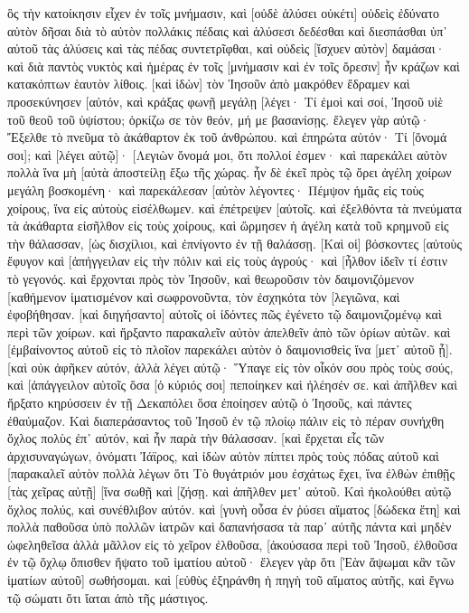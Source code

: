ὃς τὴν κατοίκησιν εἶχεν ἐν τοῖς μνήμασιν, καὶ [οὐδὲ ἁλύσει οὐκέτι] οὐδεὶς ἐδύνατο αὐτὸν δῆσαι 
διὰ τὸ αὐτὸν πολλάκις πέδαις καὶ ἁλύσεσι δεδέσθαι καὶ διεσπάσθαι ὑπ᾽ αὐτοῦ τὰς ἁλύσεις καὶ τὰς πέδας συντετρῖφθαι, καὶ οὐδεὶς [ἴσχυεν αὐτὸν] δαμάσαι· 
καὶ διὰ παντὸς νυκτὸς καὶ ἡμέρας ἐν τοῖς [μνήμασιν καὶ ἐν τοῖς ὄρεσιν] ἦν κράζων καὶ κατακόπτων ἑαυτὸν λίθοις. 
[καὶ ἰδὼν] τὸν Ἰησοῦν ἀπὸ μακρόθεν ἔδραμεν καὶ προσεκύνησεν [αὐτόν, 
καὶ κράξας φωνῇ μεγάλῃ [λέγει· Τί ἐμοὶ καὶ σοί, Ἰησοῦ υἱὲ τοῦ θεοῦ τοῦ ὑψίστου; ὁρκίζω σε τὸν θεόν, μή με βασανίσῃς. 
ἔλεγεν γὰρ αὐτῷ· Ἔξελθε τὸ πνεῦμα τὸ ἀκάθαρτον ἐκ τοῦ ἀνθρώπου. 
καὶ ἐπηρώτα αὐτόν· Τί [ὄνομά σοι]; καὶ [λέγει αὐτῷ]· [Λεγιὼν ὄνομά μοι, ὅτι πολλοί ἐσμεν· 
καὶ παρεκάλει αὐτὸν πολλὰ ἵνα μὴ [αὐτὰ ἀποστείλῃ ἔξω τῆς χώρας. 
ἦν δὲ ἐκεῖ πρὸς τῷ ὄρει ἀγέλη χοίρων μεγάλη βοσκομένη· 
καὶ παρεκάλεσαν [αὐτὸν λέγοντες· Πέμψον ἡμᾶς εἰς τοὺς χοίρους, ἵνα εἰς αὐτοὺς εἰσέλθωμεν. 
καὶ ἐπέτρεψεν [αὐτοῖς. καὶ ἐξελθόντα τὰ πνεύματα τὰ ἀκάθαρτα εἰσῆλθον εἰς τοὺς χοίρους, καὶ ὥρμησεν ἡ ἀγέλη κατὰ τοῦ κρημνοῦ εἰς τὴν θάλασσαν, [ὡς δισχίλιοι, καὶ ἐπνίγοντο ἐν τῇ θαλάσσῃ. 
[Καὶ οἱ] βόσκοντες [αὐτοὺς ἔφυγον καὶ [ἀπήγγειλαν εἰς τὴν πόλιν καὶ εἰς τοὺς ἀγρούς· καὶ [ἦλθον ἰδεῖν τί ἐστιν τὸ γεγονός. 
καὶ ἔρχονται πρὸς τὸν Ἰησοῦν, καὶ θεωροῦσιν τὸν δαιμονιζόμενον [καθήμενον ἱματισμένον καὶ σωφρονοῦντα, τὸν ἐσχηκότα τὸν [λεγιῶνα, καὶ ἐφοβήθησαν. 
[καὶ διηγήσαντο] αὐτοῖς οἱ ἰδόντες πῶς ἐγένετο τῷ δαιμονιζομένῳ καὶ περὶ τῶν χοίρων. 
καὶ ἤρξαντο παρακαλεῖν αὐτὸν ἀπελθεῖν ἀπὸ τῶν ὁρίων αὐτῶν. 
καὶ [ἐμβαίνοντος αὐτοῦ εἰς τὸ πλοῖον παρεκάλει αὐτὸν ὁ δαιμονισθεὶς ἵνα [μετ᾽ αὐτοῦ ᾖ]. 
[καὶ οὐκ ἀφῆκεν αὐτόν, ἀλλὰ λέγει αὐτῷ· Ὕπαγε εἰς τὸν οἶκόν σου πρὸς τοὺς σούς, καὶ [ἀπάγγειλον αὐτοῖς ὅσα [ὁ κύριός σοι] πεποίηκεν καὶ ἠλέησέν σε. 
καὶ ἀπῆλθεν καὶ ἤρξατο κηρύσσειν ἐν τῇ Δεκαπόλει ὅσα ἐποίησεν αὐτῷ ὁ Ἰησοῦς, καὶ πάντες ἐθαύμαζον. 
Καὶ διαπεράσαντος τοῦ Ἰησοῦ ἐν τῷ πλοίῳ πάλιν εἰς τὸ πέραν συνήχθη ὄχλος πολὺς ἐπ᾽ αὐτόν, καὶ ἦν παρὰ τὴν θάλασσαν. 
[καὶ ἔρχεται εἷς τῶν ἀρχισυναγώγων, ὀνόματι Ἰάϊρος, καὶ ἰδὼν αὐτὸν πίπτει πρὸς τοὺς πόδας αὐτοῦ 
καὶ [παρακαλεῖ αὐτὸν πολλὰ λέγων ὅτι Τὸ θυγάτριόν μου ἐσχάτως ἔχει, ἵνα ἐλθὼν ἐπιθῇς [τὰς χεῖρας αὐτῇ] [ἵνα σωθῇ καὶ [ζήσῃ. 
καὶ ἀπῆλθεν μετ᾽ αὐτοῦ. Καὶ ἠκολούθει αὐτῷ ὄχλος πολύς, καὶ συνέθλιβον αὐτόν. 
καὶ [γυνὴ οὖσα ἐν ῥύσει αἵματος [δώδεκα ἔτη] 
καὶ πολλὰ παθοῦσα ὑπὸ πολλῶν ἰατρῶν καὶ δαπανήσασα τὰ παρ᾽ αὐτῆς πάντα καὶ μηδὲν ὠφεληθεῖσα ἀλλὰ μᾶλλον εἰς τὸ χεῖρον ἐλθοῦσα, 
[ἀκούσασα περὶ τοῦ Ἰησοῦ, ἐλθοῦσα ἐν τῷ ὄχλῳ ὄπισθεν ἥψατο τοῦ ἱματίου αὐτοῦ· 
ἔλεγεν γὰρ ὅτι [Ἐὰν ἅψωμαι κἂν τῶν ἱματίων αὐτοῦ] σωθήσομαι. 
καὶ [εὐθὺς ἐξηράνθη ἡ πηγὴ τοῦ αἵματος αὐτῆς, καὶ ἔγνω τῷ σώματι ὅτι ἴαται ἀπὸ τῆς μάστιγος. 
